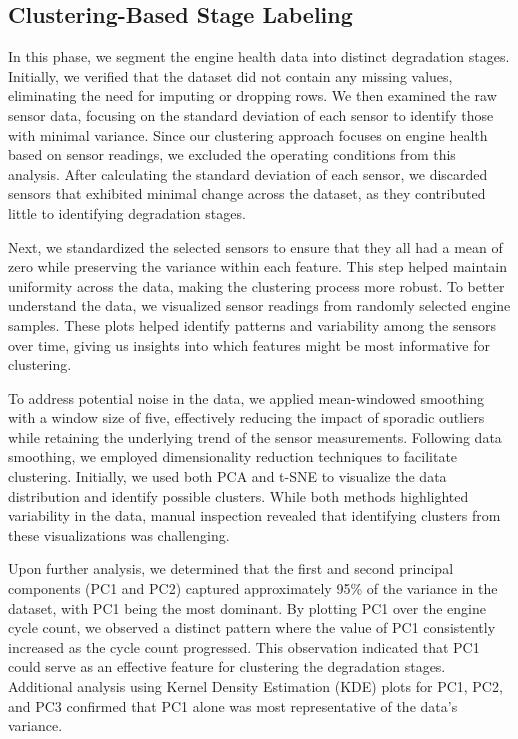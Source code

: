 \documentclass[conference]{IEEEtran}
\begin{document}
\subsection{Clustering-Based Stage Labeling}
In this phase, we segment the engine health data into distinct degradation stages. Initially, we verified that the dataset did not contain any missing values, eliminating the need for imputing or dropping rows. We then examined the raw sensor data, focusing on the standard deviation of each sensor to identify those with minimal variance. Since our clustering approach focuses on engine health based on sensor readings, we excluded the operating conditions from this analysis. After calculating the standard deviation of each sensor, we discarded sensors that exhibited minimal change across the dataset, as they contributed little to identifying degradation stages.

Next, we standardized the selected sensors to ensure that they all had a mean of zero while preserving the variance within each feature. This step helped maintain uniformity across the data, making the clustering process more robust. To better understand the data, we visualized sensor readings from randomly selected engine samples. These plots helped identify patterns and variability among the sensors over time, giving us insights into which features might be most informative for clustering.

To address potential noise in the data, we applied mean-windowed smoothing with a window size of five, effectively reducing the impact of sporadic outliers while retaining the underlying trend of the sensor measurements. Following data smoothing, we employed dimensionality reduction techniques to facilitate clustering. Initially, we used both PCA and t-SNE to visualize the data distribution and identify possible clusters. While both methods highlighted variability in the data, manual inspection revealed that identifying clusters from these visualizations was challenging.

Upon further analysis, we determined that the first and second principal components (PC1 and PC2) captured approximately 95\% of the variance in the dataset, with PC1 being the most dominant. By plotting PC1 over the engine cycle count, we observed a distinct pattern where the value of PC1 consistently increased as the cycle count progressed. This observation indicated that PC1 could serve as an effective feature for clustering the degradation stages. Additional analysis using Kernel Density Estimation (KDE) plots for PC1, PC2, and PC3 confirmed that PC1 alone was most representative of the data's variance.
\end{document}
